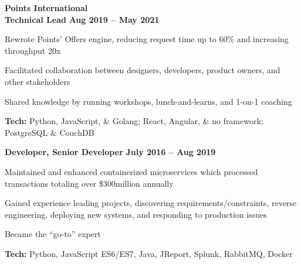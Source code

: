 \documentclass[margin,line]{resume}
\begin{document}
\begin{resume}
    \hspace{-3mm}\textbf{\listing Points International} \vspace{2mm}\\\vspace{1mm}
    \hspace{1.2mm}\textbf{Technical Lead} \hfill \textbf{Aug 2019 -- May 2021}\vspace{1mm}
    \begin{list2}
        \item Rewrote Points’ Offers engine, reducing request time up to 60\% and increasing throughput 20x
        \vspace{1mm}
        \item Facilitated collaboration between designers, developers, product owners, and other stakeholders
        \vspace{1mm}
        \item Shared knowledge by running workshops, lunch-and-learns, and 1-on-1 coaching
        \vspace{1mm}
        \item\textbf{Tech:} Python, JavaScript, \& Golang; React, Angular, \& no framework; PostgreSQL \& CouchDB
    \end{list2}

    \hspace{2.6mm}\textbf{Developer, Senior Developer} \hfill \textbf{July 2016 -- Aug 2019}\vspace{1mm}
    \begin{list2}
        \item Maintained and enhanced containerized microservices which processed transactions totaling over \$300million annually
        \vspace{1mm}
        \item Gained experience leading projects, discovering requirements/constraints, reverse engineering, deploying new systems, and responding to production issues
        \vspace{1mm}
        \item Became the “go-to” expert
        \vspace{1mm}
        \item\textbf{Tech:} Python, JavaScript ES6/ES7, Java, JReport, Splunk, RabbitMQ, Docker
    \end{list2}


\end{resume}
\end{document}
